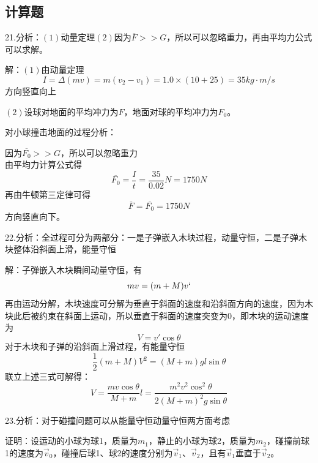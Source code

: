 \documentclass[blue, normal]{./templete/qyxfnote}
\begin{document}
\begin{multicols}{2}
		\subsection{计算题}
			21.分析：$(1)$动量定理$(2)$因为$\overline{F}>>G$，所以可以忽略重力，再由平均力公式可以求解。
			
			解：$(1)$由动量定理
			\begin{equation*}
			I=\Delta(mv)=m(v_2-v_1)=1.0\times(10+25)=35kg\cdot m/s
			\end{equation*}
			方向竖直向上
			
			$(2)$设球对地面的平均冲力为$F$，地面对球的平均冲力为$F_0$。
			
			对小球撞击地面的过程分析：
			
			因为$\overline{F_0}>>G$，所以可以忽略重力\\
			由平均力计算公式得
			\begin{equation*}
			\overline{F_0}=\frac{I}{t}=\frac{35}{0.02}N=1750N
			\end{equation*}
			再由牛顿第三定律可得
			\begin{equation*}
			\overline{F}=\overline{F_0}=1750N
			\end{equation*}
			方向竖直向下。
			
			22.分析：全过程可分为两部分：一是子弹嵌入木块过程，动量守恒，二是子弹木块整体沿斜面上滑，能量守恒
			
			解：子弹嵌入木块瞬间动量守恒，有
			\begin{equation*}
			mv=(m+M)v`
			\end{equation*}
			再由运动分解，木块速度可分解为垂直于斜面的速度和沿斜面方向的速度，因为木块此后被约束在斜面上运动，所以垂直于斜面的速度突变为$0$，即木块的运动速度为
			\begin{equation*}
			V=v'\cos\theta
			\end{equation*}
			对于木块和子弹的沿斜面上滑过程，有能量守恒
			\begin{equation*}
			\frac{1}{2}(m+M)V^2=(M+m)gl\sin\theta
			\end{equation*}
			联立上述三式可解得：
			\begin{equation*}
			V=\frac{mv\cos\theta}{M+m}
			l=\frac{m^2v^2\cos^2\theta}{2(M+m)^2g\sin\theta}
			\end{equation*}
			
			23.分析：对于碰撞问题可以从能量守恒动量守恒两方面考虑
			
			证明：设运动的小球为球1，质量为$m_1$，静止的小球为球2，质量为$m_2$，碰撞前球1的速度为$\vec{v}_0$，碰撞后球1、球2的速度分别为$\vec{v}_1、\vec{v}_2$，且有$\vec{v}_1$垂直于$\vec{v}_2$。
			

\end{multicols}
\end{document}
